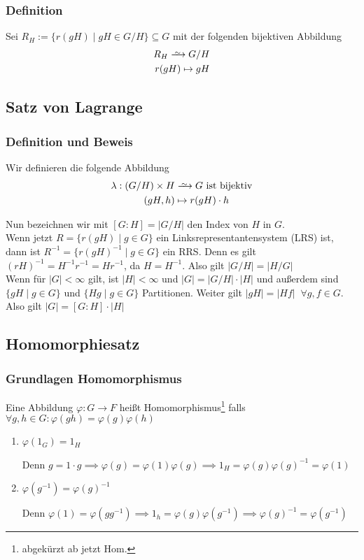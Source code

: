\documentclass[12pt, german]{article}
\newcommand\iso{\xrightarrow{
		\,\smash{\raisebox{-0.65ex}{\ensuremath{\scriptstyle\sim}}}\,}}
\begin{document}
\subsubsection{Definition}
	Sei $R_H := \{r(gH) \mid gH \in G/H\} \subseteq G$ mit der folgenden bijektiven  Abbildung
	\begin{align*}
		R_H \iso G/H \\
		r(gH) \mapsto gH 
	\end{align*}
\subsection{Satz von Lagrange}		
\subsubsection{Definition und Beweis}
	Wir definieren die folgende Abbildung
	\begin{align*}
		\lambda: (G/H) \times H &\iso G \text{ ist bijektiv} \\
		(gH, h) &\mapsto r(gH) \cdot h
	\end{align*}
	 
	Nun bezeichnen wir mit $[G:H] = |G/H|$ den Index von $H$ in $G$. \\ 
	Wenn jetzt $R = \{r(gH) \mid g \in G \}$ ein Linksrepresentantensystem (LRS) ist, \\ 
	dann ist $R^{-1} = \{r(gH)^{-1} \mid g \in G \}$ ein RRS. 
	Denn es gilt $(rH)^{-1} = H^{-1}r^{-1} = Hr^{-1}$, da $H=H^{-1}$.
	Also gilt $|G/H| = |H/G|$ \\
	
	Wenn für $|G| < \infty $ gilt, ist $|H| < \infty $ und $|G| = |G/H| \cdot |H|$ und 
	außerdem sind $\{gH \mid g \in G \}$ und $\{Hg \mid g \in G \}$ Partitionen. Weiter gilt $|gH| = |Hf| \;\;\forall g,f \in G$. \\
	Also gilt $|G| = [G:H] \cdot |H|$ 

\newpage
\subsection{Homomorphiesatz}		
\subsubsection{Grundlagen Homomorphismus}
	Eine Abbildung $\varphi: G \to F$ heißt Homomorphismus\footnote{abgekürzt ab jetzt Hom.} falls $\forall g,h \in G : \varphi(gh) = \varphi(g)\varphi(h)$ \\
	\begin{enumerate}[label=\roman*)]
		\item $\varphi(1_G) = 1_H$ ~\par
			Denn $g=1\cdot g \implies \varphi(g)=\varphi(1)\varphi(g) \implies 1_H = \varphi(g) \varphi(g)^{-1} = \varphi(1)$
		
		\item $\varphi(g^{-1})=\varphi(g)^{-1}$ ~\par
			Denn $\varphi(1)=\varphi(gg^{-1}) \implies 1_h = \varphi(g)\varphi(g^{-1}) \implies \varphi(g)^{-1} = \varphi(g^{-1})$
	\end{enumerate}
\end{document}
